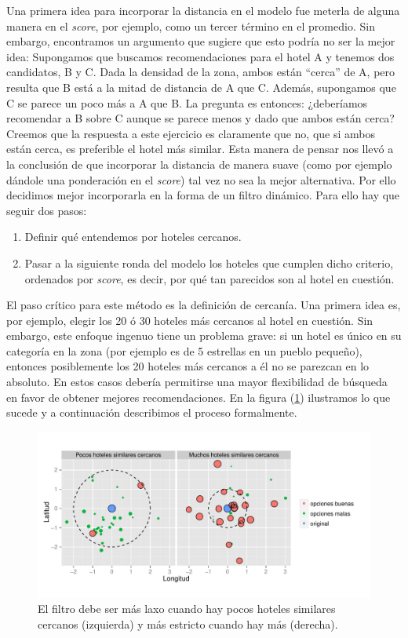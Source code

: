 \documentclass[12pt]{report}
\begin{document}
Una primera idea para incorporar la distancia en el modelo fue meterla de alguna manera en el \emph{score}, por ejemplo, como un tercer término en el promedio. Sin embargo, encontramos un argumento que sugiere que esto podría no ser la mejor idea: Supongamos que buscamos recomendaciones para el hotel A y tenemos dos candidatos, B y C. Dada la densidad de la zona, ambos están ``cerca'' de A, pero resulta que B está a la mitad de distancia de A que C. Además, supongamos que C se parece un poco más a A que B. La pregunta es entonces: ¿deberíamos recomendar a B sobre C aunque se parece menos y dado que ambos están cerca? Creemos que la respuesta a este ejercicio es claramente que no, que si ambos están cerca, es preferible el hotel más similar. Esta manera de pensar nos llevó a la conclusión de que incorporar la distancia de manera suave (como por ejemplo dándole una ponderación en el \emph{score}) tal vez no sea la mejor alternativa. Por ello decidimos mejor incorporarla en la forma de un filtro dinámico. Para ello hay que seguir dos pasos:
\begin{enumerate}
	\item Definir qué entendemos por hoteles cercanos.
	\item Pasar a la siguiente ronda del modelo los hoteles que cumplen dicho criterio, ordenados por \emph{score}, es decir, por qué tan parecidos son al hotel en cuestión.
\end{enumerate}
El paso crítico para este método es la definición de cercanía. Una primera idea es, por ejemplo, elegir los 20 ó 30 hoteles más cercanos al hotel en cuestión. Sin embargo, este enfoque ingenuo tiene un problema grave: si un hotel es único en su categoría en la zona (por ejemplo es de 5 estrellas en un pueblo pequeño), entonces posiblemente los 20 hoteles más cercanos a él no se parezcan en lo absoluto. En estos casos debería permitirse una mayor flexibilidad de búsqueda en favor de obtener mejores recomendaciones. En la figura (\ref{fig:distdin}) ilustramos lo que sucede y a continuación describimos el proceso formalmente.
\begin{figure}[ht]
	\centering
	\includegraphics[width=\textwidth]{imagenes/distdin.pdf}
	\caption{\label{fig:distdin} El filtro debe ser más laxo cuando hay pocos hoteles similares cercanos (izquierda) y más estricto cuando hay más (derecha).}
\end{figure}
\end{document}
